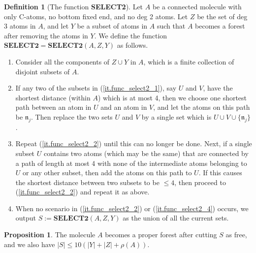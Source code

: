 \documentclass[10pt, reqno]{amsart}
\newcommand{\nf}{\mathfrak n}
\theoremstyle{definition}
\newtheorem{proposition}[theorem]{Proposition}
\newtheorem{definition}[theorem]{Definition}
\theoremstyle{remark}
\numberwithin{equation}{section}
\begin{document}
\begin{definition}[The function \textbf{SELECT2}]
\label{def.func_select2} Let $A$ be a connected molecule with only C-atoms, no bottom fixed end, and no deg 2 atoms. Let $Z$ be the set of deg 3 atoms in $A$, and let $Y$ be a subset of atoms in $A$ such that $A$ becomes a forest after removing the atoms in $Y$. We define the function $\textbf{SELECT2}=\textbf{SELECT2}(A,Z,Y)$ as follows.
\begin{enumerate}
\item\label{it.func_select2_1} Consider all the components of $Z\cup Y$ in $A$, which is a finite collection of disjoint subsets of $A$.
\item\label{it.func_select2_2} If any two of the subsets in (\ref{it.func_select2_1}), say $U$ and $V$, have the shortest distance (within $A$) which is at most 4, then we choose one shortest path between an atom in $U$ and an atom in $V$, and let the atoms on this path be $\nf_j$. Then replace the two sets $U$ and $V$ by a single set which is $U\cup V\cup \{\nf_j\}$.
\item\label{it.func_select2_4} Repeat (\ref{it.func_select2_2}) until this can no longer be done. Next, if a single subset $U$ contains two atoms (which may be the same) that are connected by a path of length at most 4 with none of the intermediate atoms belonging to $U$ or any other subset, then add the atoms on this path to $U$. If this causes the shortest distance between two subsets to be $\leq 4$, then proceed to (\ref{it.func_select2_2}) and repeat it as above.
\item\label{it.func_select2_5} When no scenario in (\ref{it.func_select2_2}) or (\ref{it.func_select2_4}) occurs, we output $S:=\textbf{SELECT2}(A,Z,Y)$ as the union of all the current sets.
\end{enumerate}
\end{definition}
\begin{proposition}\label{prop.func_select2} The molecule $A$ becomes a proper forest after cutting $S$ as free, and we also have $|S|\leq 10(|Y|+|Z|+\rho(A))$.
\end{proposition}
\end{document}
